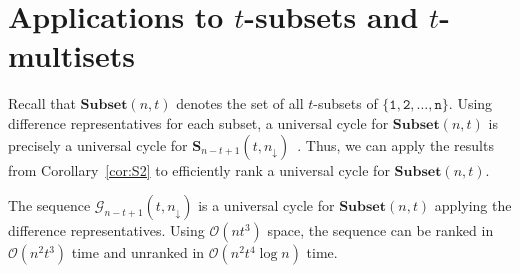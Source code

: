 \documentclass[US-letter,USenglish,authorcolumns,autoref]{lipics-v2021}
\renewcommand{\tt} {\mathtt}
\begin{document}
\section{Applications to $t$-subsets and $t$-multisets} \label{sec:subset}



Recall that $\mathbf{Subset}(n,t)$ denotes the set of all $t$-subsets of $\{\tt{1,2,\ldots , n}\}$. 
Using difference representatives for each subset, a universal cycle for $\mathbf{Subset}(n,t)$ is precisely  a universal cycle for  $\mathbf{S}_{n-t+1}(t,n_\downarrow)$~\cite{difference}.  
Thus, we can apply the results from Corollary~\ref{cor:S2} to efficiently rank a universal cycle for $\mathbf{Subset}(n,t)$.  
%


\begin{theorem}
 The sequence $\mathcal{G}_{n-t+1}(t,n_\downarrow)$ is a universal cycle for $\mathbf{Subset}(n,t)$ applying the difference representatives. 
 Using $\mathcal{O}(nt^3)$ space, the sequence can be ranked in $\mathcal{O}(n^2t^3)$ time and unranked in $\mathcal{O}(n^2t^4\log n)$ time.
\end{theorem}
\end{document}
